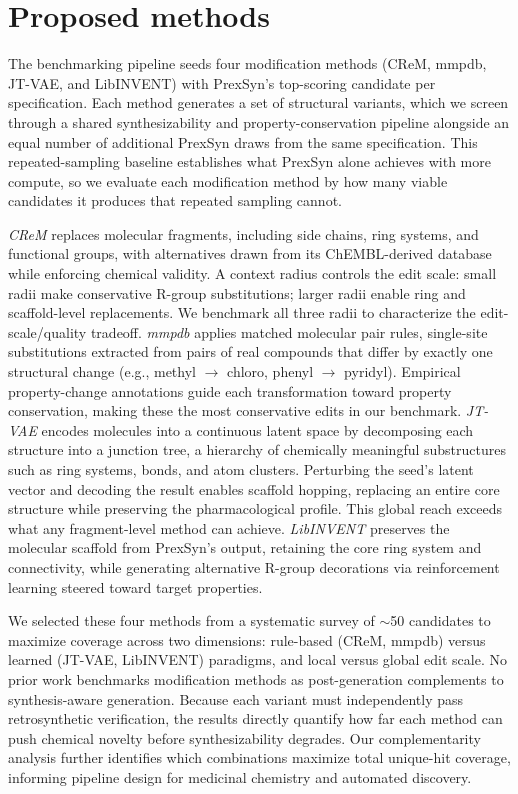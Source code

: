 \section*{Proposed methods}

The benchmarking pipeline seeds four modification methods (CReM, mmpdb, JT-VAE, and LibINVENT) with PrexSyn's top-scoring candidate per specification. Each method generates a set of structural variants, which we screen through a shared synthesizability and property-conservation pipeline alongside an equal number of additional PrexSyn draws from the same specification. This repeated-sampling baseline establishes what PrexSyn alone achieves with more compute, so we evaluate each modification method by how many viable candidates it produces that repeated sampling cannot.

\textit{CReM} \cite{bib7} replaces molecular fragments, including side chains, ring systems, and functional groups, with alternatives drawn from its ChEMBL-derived database while enforcing chemical validity. A context radius controls the edit scale: small radii make conservative R-group substitutions; larger radii enable ring and scaffold-level replacements. We benchmark all three radii to characterize the edit-scale/quality tradeoff.
\textit{mmpdb} \cite{bib8} applies matched molecular pair rules, single-site substitutions extracted from pairs of real compounds that differ by exactly one structural change (e.g., methyl $\rightarrow$ chloro, phenyl $\rightarrow$ pyridyl). Empirical property-change annotations guide each transformation toward property conservation, making these the most conservative edits in our benchmark.
\textit{JT-VAE} \cite{bib9} encodes molecules into a continuous latent space by decomposing each structure into a junction tree, a hierarchy of chemically meaningful substructures such as ring systems, bonds, and atom clusters. Perturbing the seed's latent vector and decoding the result enables scaffold hopping, replacing an entire core structure while preserving the pharmacological profile. This global reach exceeds what any fragment-level method can achieve.
\textit{LibINVENT} \cite{bib10,bib11} preserves the molecular scaffold from PrexSyn's output, retaining the core ring system and connectivity, while generating alternative R-group decorations via reinforcement learning steered toward target properties.

We selected these four methods from a systematic survey of $\sim$50 candidates to maximize coverage across two dimensions: rule-based (CReM, mmpdb) versus learned (JT-VAE, LibINVENT) paradigms, and local versus global edit scale. No prior work benchmarks modification methods as post-generation complements to synthesis-aware generation. Because each variant must independently pass retrosynthetic verification, the results directly quantify how far each method can push chemical novelty before synthesizability degrades. Our complementarity analysis further identifies which combinations maximize total unique-hit coverage, informing pipeline design for medicinal chemistry and automated discovery.

